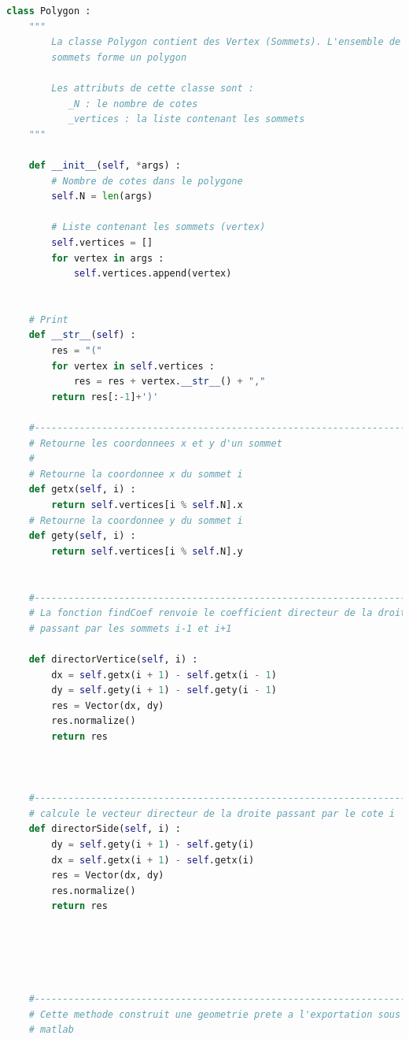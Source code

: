 \documentclass[a4paper,reqno]{article}
\begin{document}
\begin{lstlisting}[language=Python,frame=single,caption=Création de la classe Polygon]
class Polygon : 
    """
        La classe Polygon contient des Vertex (Sommets). L'ensemble de ces 
        sommets forme un polygon 
        
        Les attributs de cette classe sont : 
           _N : le nombre de cotes 
           _vertices : la liste contenant les sommets
    """
    
    def __init__(self, *args) : 
        # Nombre de cotes dans le polygone
        self.N = len(args)                                   
        
        # Liste contenant les sommets (vertex)
        self.vertices = []                                    
        for vertex in args : 
            self.vertices.append(vertex)         
            
            
    # Print
    def __str__(self) : 
        res = "(" 
        for vertex in self.vertices : 
            res = res + vertex.__str__() + ","
        return res[:-1]+')'
    
    #----------------------------------------------------------------------  
    # Retourne les coordonnees x et y d'un sommet 
    #
    # Retourne la coordonnee x du sommet i 
    def getx(self, i) : 
        return self.vertices[i % self.N].x 
    # Retourne la coordonnee y du sommet i 
    def gety(self, i) : 
        return self.vertices[i % self.N].y 
    
    
    #---------------------------------------------------------------------
    # La fonction findCoef renvoie le coefficient directeur de la droite 
    # passant par les sommets i-1 et i+1 
    
    def directorVertice(self, i) : 
        dx = self.getx(i + 1) - self.getx(i - 1)
        dy = self.gety(i + 1) - self.gety(i - 1) 
        res = Vector(dx, dy)
        res.normalize()
        return res 
        
    
    
    #----------------------------------------------------------------------   
    # calcule le vecteur directeur de la droite passant par le cote i 
    def directorSide(self, i) : 
        dy = self.gety(i + 1) - self.gety(i)
        dx = self.getx(i + 1) - self.getx(i)
        res = Vector(dx, dy)
        res.normalize() 
        return res 
          
    



    #---------------------------------------------------------------------    
    # Cette methode construit une geometrie prete a l'exportation sous 
    # matlab
    

\end{lstlisting}
\end{document}
